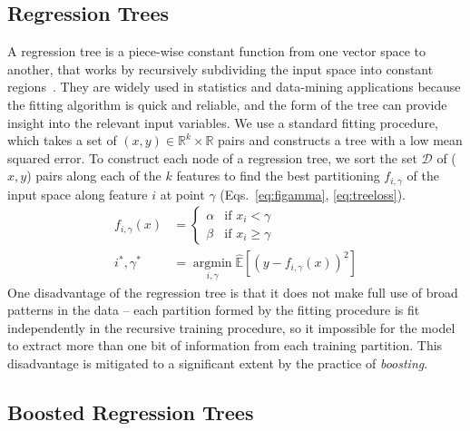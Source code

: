 \documentclass{sig-alternate}
\begin{document}
\subsection{Regression Trees}
\label{sec:brtree}

A regression tree is a piece-wise constant function from one vector space to another,
that works by recursively subdividing the input space into constant regions~\citep{breiman+friedman+olshen+stone:1984, hastie+tibshirani+friedman:2001}.
They are widely used in statistics and data-mining applications because the fitting algorithm is quick and reliable, and the form of the tree can provide insight into the relevant input variables.
We use a standard fitting procedure, which takes a set of
$(x, y)\in \mathbb{R}^k \times \mathbb{R}$ pairs and constructs a tree with a low mean squared error.
To construct each node of a regression tree,
we sort the set $\mathcal{D}$ of ($x,y$) pairs along each of the $k$ features to find the best partitioning $f_{i,\gamma}$ of the input space along feature $i$ at point $\gamma$ (Eqs.~\ref{eq:figamma}, \ref{eq:treeloss}).
\begin{align}
    f_{i,\gamma}(x) &=
    \begin{cases}
        \alpha  &\text{if $x_i < \gamma$} \\
        \beta &\text{if $x_i \geq \gamma$}
    \end{cases}
    \label{eq:figamma}\\
    i^*, \gamma^* &= \operatorname*{argmin}_{i, \gamma} \mathbb{\hat E}\left[ (y - f_{i,\gamma}(x))^2 \right]
    \label{eq:treeloss}
\end{align}
One disadvantage of the regression tree is that it does not make full use of broad patterns in the data -- each partition formed by the fitting procedure is fit independently in the recursive training procedure,
so it impossible for the model to extract more than one bit of information from each training partition.
This disadvantage is mitigated to a significant extent by the practice of {\em boosting}.

\subsection{Boosted Regression Trees}
\end{document}
